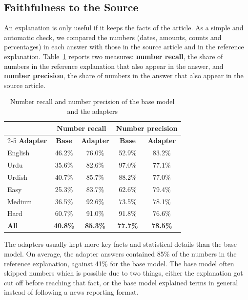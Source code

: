 \documentclass{FastFyp}
\begin{document}
\subsection{Faithfulness to the Source}
An explanation is only useful if it keeps the facts of the article. As a simple and automatic check, we compared the numbers (dates, amounts, counts and percentages) in each answer with those in the source article and in the reference explanation. Table~\ref{tab:faithfulness} reports two measures: \textbf{number recall}, the share of numbers in the reference explanation that also appear in the answer, and \textbf{number precision}, the share of numbers in the answer that also appear in the source article.

\begin{table}[H]
\centering
\caption{Number recall and number precision of the base model and the adapters}
\label{tab:faithfulness}
\small
\begin{tabular}{|l|c|c|c|c|}
\hline
 & \multicolumn{2}{c|}{\textbf{Number recall}} & \multicolumn{2}{c|}{\textbf{Number precision}} \\ \cline{2-5}
\textbf{Adapter} & \textbf{Base} & \textbf{Adapter} & \textbf{Base} & \textbf{Adapter} \\ \hline
English & 46.2\% & 76.0\% & 52.9\% & 83.2\% \\ \hline
Urdu    & 35.6\% & 82.6\% & 97.0\% & 77.1\% \\ \hline
Urdish  & 40.7\% & 85.7\% & 88.2\% & 77.0\% \\ \hline
Easy    & 25.3\% & 83.7\% & 62.6\% & 79.4\% \\ \hline
Medium  & 36.5\% & 92.6\% & 73.5\% & 78.1\% \\ \hline
Hard    & 60.7\% & 91.0\% & 91.8\% & 76.6\% \\ \hline
\textbf{All} & \textbf{40.8\%} & \textbf{85.3\%} & \textbf{77.7\%} & \textbf{78.5\%} \\ \hline
\end{tabular}
\end{table}

The adapters usually kept more key facts and statistical details than the base model. On average, the adapter answers contained 85\% of the numbers in the reference explanation, against 41\% for the base model. The base model often skipped numbers which is possible due to two things, either the explanation got cut off before reaching that fact, or the base model explained terms in general instead of following a news reporting format.
\end{document}
